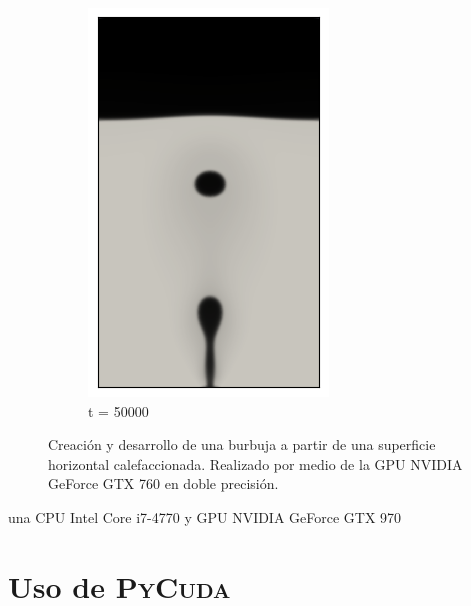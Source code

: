 \begin{figure}[H]
\begin{subfigure}{0.25\textwidth}
		\includegraphics[width=\linewidth]{figs/cap4/cuda_bb_760_d50}
		\caption{t = 50000}
		\label{fig:9}
	\end{subfigure}
	\caption{Creación y desarrollo de una burbuja a partir de una superficie horizontal calefaccionada. Realizado por medio de la GPU NVIDIA GeForce GTX 760 en doble precisión.}
	\label{fig:burbujas_760_doble_cuda}
\end{figure}

\newpage
una CPU Intel Core i7-4770 y GPU NVIDIA GeForce GTX 970
\section{Uso de \textsc{PyCuda}}

